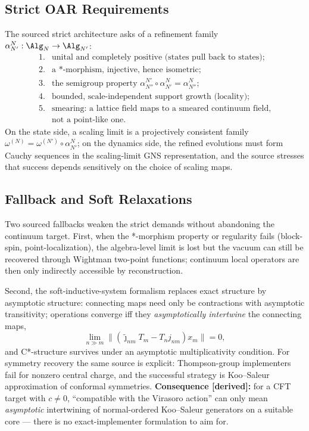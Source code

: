 \subsection{Strict OAR Requirements}

The sourced strict architecture asks of a refinement family
\(\alpha_{N'}^{N}:\Alg_N\to\Alg_{N'}\):
\[
\begin{array}{ll}
1.&\text{unital and completely positive (states pull back to states);}\\
2.&\text{a *-morphism, injective, hence isometric;}\\
3.&\text{the semigroup property }
   \alpha_{N''}^{N'}\circ\alpha_{N'}^{N}=\alpha_{N''}^{N};\\
4.&\text{bounded, scale-independent support growth (locality);}\\
5.&\text{smearing: a lattice field maps to a smeared continuum field,}\\
  &\text{not a point-like one.}
\end{array}
\]
On the state side, a scaling limit is a projectively consistent family
\(\omega^{(N)}=\omega^{(N')}\circ\alpha_{N'}^{N}\); on the dynamics side, the
refined evolutions must form Cauchy sequences in the scaling-limit GNS
representation, and the source stresses that success depends sensitively on
the choice of scaling maps.

\subsection{Fallback and Soft Relaxations}

Two sourced fallbacks weaken the strict demands without abandoning the
continuum target.  First, when the *-morphism property or regularity fails
(block-spin, point-localization), the algebra-level limit is lost but the
vacuum can still be recovered through Wightman two-point functions; continuum
local operators are then only indirectly accessible by reconstruction.

Second, the soft-inductive-system formalism replaces exact structure by
asymptotic structure: connecting maps need only be contractions with
asymptotic transitivity; operations converge iff they \emph{asymptotically
intertwine} the connecting maps,
\[
  \lim_{n\gg m}\bigl\|(\tilde\jmath_{nm}T_m-T_n j_{nm})x_m\bigr\|=0,
\]
and C*-structure survives under an asymptotic multiplicativity condition.
For symmetry recovery the same source is explicit: Thompson-group implementers
fail for nonzero central charge, and the successful strategy is Koo--Saleur
approximation of conformal symmetries.  \textbf{Consequence [derived]:} for a
CFT target with \(c\neq0\), ``compatible with the Virasoro action'' can only
mean \emph{asymptotic} intertwining of normal-ordered Koo--Saleur generators
on a suitable core --- there is no exact-implementer formulation to aim for.


